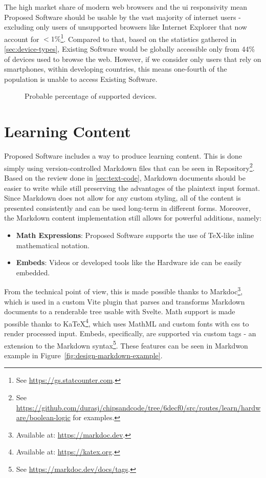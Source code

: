 The high market share of modern web browsers and the \gls{ui} responsivity mean Proposed Software should be usable by the vast majority of internet users - excluding only users of unsupported browsers like Internet Explorer that now account for $<1\%$\footnote{See \url{https://gs.statcounter.com}.}.
Compared to that, based on the statistics gathered in \autoref{sec:device-types}, Existing Software would be globally accessible only from 44\% of devices used to browse the web.
However, if we consider only users that rely on smartphones, within developing countries, this means one-fourth of the population is unable to access Existing Software.

\begin{figure}[H]
    \centering
    
    \caption{Probable percentage of supported devices.}
    \label{fig:design-device-support}
\end{figure}

\section{Learning Content}

Proposed Software includes a way to produce learning content.
This is done simply using version-controlled Markdown files that can be seen in Repository\footnote{See \url{https://github.com/durasj/chipsandcode/tree/6decf0/src/routes/learn/hardware/boolean-logic} for examples.}.
Based on the review done in \autoref{sec:text-code}, Markdown documents should be easier to write while still preserving the advantages of the plaintext input format.
Since Markdown does not allow for any custom styling, all of the content is presented consistently and can be used long-term in different forms.
Moreover, the Markdown content implementation still allows for powerful additions, namely:

\begin{itemize}
    \item \textbf{Math Expressions}: Proposed Software supports the use of TeX-like inline mathematical notation.
    \item \textbf{Embeds}: Videos or developed tools like the Hardware \gls{ide} can be easily embedded.
\end{itemize}

From the technical point of view, this is made possible thanks to Markdoc\footnote{Available at: \url{https://markdoc.dev}.}, which is used in a custom Vite plugin that parses and transforms Markdown documents to a renderable tree usable with Svelte.
Math support is made possible thanks to KaTeX\footnote{Available at: \url{https://katex.org}.}, which uses MathML and custom fonts with \gls{css} to render processed input.
Embeds, specifically, are supported via custom tags - an extension to the Markdown syntax\footnote{See \url{https://markdoc.dev/docs/tags}.}.
These features can be seen in Markdwon example in Figure~\ref{fig:design-markdown-example}.

